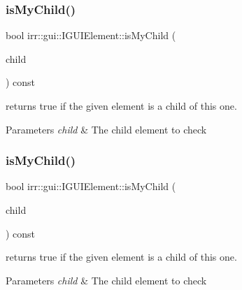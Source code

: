 \subsubsection{\texorpdfstring{is\+My\+Child()}{isMyChild()}\hspace{0.1cm}{\footnotesize\ttfamily [1/2]}}
{\footnotesize\ttfamily bool irr\+::gui\+::\+I\+G\+U\+I\+Element\+::is\+My\+Child (\begin{DoxyParamCaption}\item[{\hyperlink{classirr_1_1gui_1_1IGUIElement}{I\+G\+U\+I\+Element} $\ast$}]{child }\end{DoxyParamCaption}) const\hspace{0.3cm}{\ttfamily [inline]}}



returns true if the given element is a child of this one. 


\begin{DoxyParams}{Parameters}
{\em child} & The child element to check \\
\hline
\end{DoxyParams}
\mbox{\label{classirr_1_1gui_1_1IGUIElement_a72fe3668d62bfb7edc4586d582a947b4}} 
\subsubsection{\texorpdfstring{is\+My\+Child()}{isMyChild()}\hspace{0.1cm}{\footnotesize\ttfamily [2/2]}}
{\footnotesize\ttfamily bool irr\+::gui\+::\+I\+G\+U\+I\+Element\+::is\+My\+Child (\begin{DoxyParamCaption}\item[{\hyperlink{classirr_1_1gui_1_1IGUIElement}{I\+G\+U\+I\+Element} $\ast$}]{child }\end{DoxyParamCaption}) const\hspace{0.3cm}{\ttfamily [inline]}}



returns true if the given element is a child of this one. 


\begin{DoxyParams}{Parameters}
{\em child} & The child element to check \\
\hline
\end{DoxyParams}
\mbox{\label{classirr_1_1gui_1_1IGUIElement_a940fcf886f9ae1e4bc719e19057018a2}} 
